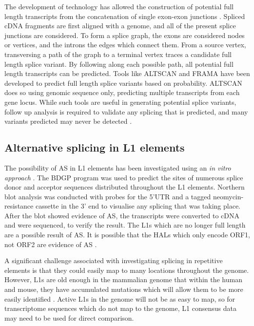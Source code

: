 \documentclass[12pt]{article}
\begin{document}
			The development of technology has allowed the construction of potential full length transcripts from the concatenation of single exon-exon junctions \citep{Florea06}.
			Spliced cDNA fragments are first aligned with a genome, and all of the present splice junctions are considered.
			To form a splice graph, the exons are considered nodes or vertices, and the introns the edges which connect them. 
			From a source vertex, transversing a path of the graph to a terminal vertex traces a candidate full length splice variant. 
			By following along each possible path, all potential full length transcripts can be predicted.
			Tools like ALTSCAN \citep{Hu15} and FRAMA \citep{Bens16} have been developed to predict full length splice variants based on probability.
			ALTSCAN does so using genomic sequence only, predicting multiple transcripts from each gene locus. 
			While such tools are useful in generating potential splice variants, follow up analysis is required to validate any splicing that is predicted, and many variants predicted may never be detected \citep{Florea06, Hu15}. 
				
		\subsection{Alternative splicing in L1 elements}
	
			The possibility of AS in L1 elements has been investigated using an \textit{in vitro approach} \citep{Belancio06}.
			The BDGP program \citep{Reese97} was used to predict the sites of numerous splice donor and acceptor sequences distributed throughout the L1 elements. 
			Northern blot analysis was conducted with probes for the 5'UTR and a tagged neomycin-resistance cassette in the 3' end to visualise any splicing that was taking place.
			After the blot showed evidence of AS, the transcripts were converted to cDNA and were sequenced, to verify the result. 
			The L1s which are no longer full length are a possible result of AS. It is possible that the HALs which only encode ORF1, not ORF2 are evidence of AS \citep{Bao10}. 
			
			A significant challenge associated with investigating splicing in repetitive elements is that they could easily map to many locations throughout the genome.
			However, L1s are old enough in the mammalian genome that within the human and mouse, they have accumulated mutations which will allow them to be more easily identified \citep{Brouha03,Goodier13}.
			Active L1s in the genome will not be as easy to map, so for transcriptome sequences which do not map to the genome, L1 consensus data may need to be used for direct comparison.
	
\end{document}
